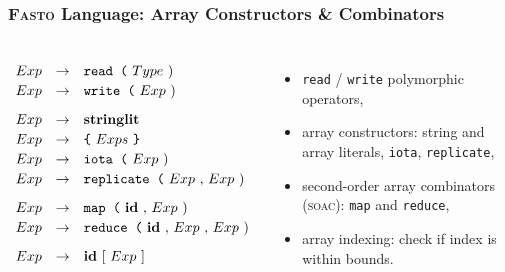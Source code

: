 \documentclass{beamer}
\begin{document}
\begin{frame}[fragile,t]
\frametitle{\textsc{Fasto} Language: Array Constructors \& Combinators}

\begin{columns}
\renewcommand{\arraystretch}{0.85}
\[\begin{array}{lcl}
Exp & \rightarrow & \mbox{\tt read~(}~Type~\mbox{)} \\[.5ex]
Exp & \rightarrow & \mbox{\tt write~(}~Exp~\mbox{)} \\[2ex]

Exp & \rightarrow & \mbox{\bf stringlit} \\ [.5ex]
Exp & \rightarrow & \mbox{\tt \{}~Exps~\mbox{\tt \}}\\[.5ex]
Exp & \rightarrow & \mbox{\tt iota~(}~Exp~\mbox{)} \\[.5ex]
Exp & \rightarrow & \mbox{\tt replicate~(}~Exp~{\tt ,}~Exp~\mbox{)} \\[2ex]

Exp & \rightarrow & \mbox{\tt map~(}~{\bf id}~{\tt ,}~Exp~\mbox{)} \\[.5ex]
Exp & \rightarrow & \mbox{\tt reduce~(}~{\bf id}~{\tt ,}~Exp~{\tt ,}~Exp~\mbox{)} \\[2ex]

Exp & \rightarrow & \mbox{\bf id}~{\tt [}~Exp~{\tt ]} \\
\end{array}\]

\begin{itemize}
    \item {\tt read} / {\tt write} polymorphic operators,
    \item array constructors: string and array literals, {\tt iota}, {\tt replicate},
    \item second-order array combinators (\textsc{soac}): {\tt map} and {\tt reduce},
    \item array indexing: check if index is within bounds.
\end{itemize}
\end{columns}

\end{frame}
\end{document}
